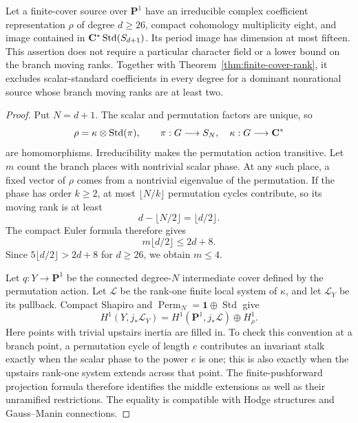 \begin{theorem}\label{thm:scalar-standard-all}
Let a finite-cover source over $\mathbf P^1$ have an irreducible
complex coefficient representation $\rho$ of degree $d\ge26$,
compact cohomology multiplicity eight, and image contained in
$\mathbf C^*\operatorname{Std}(S_{d+1})$. Its period image has dimension
at most fifteen. This assertion does not require a particular
character field or a lower bound on the branch moving ranks.
Together with Theorem~\ref{thm:finite-cover-rank}, it excludes
scalar-standard coefficients in every degree for a dominant
nonrational source whose branch moving ranks are at least two.
\end{theorem}

\begin{proof}
Put $N=d+1$. The scalar and permutation factors are unique, so
\[
 \rho=\kappa\otimes\operatorname{Std}(\pi),\qquad
 \pi:G\longrightarrow S_N,\quad\kappa:G\longrightarrow\mathbf C^*
\]
are homomorphisms. Irreducibility makes the permutation action
transitive. Let $m$ count the branch places with nontrivial scalar
phase. At any such place, a fixed vector of $\rho$ comes from a
nontrivial eigenvalue of the permutation. If the phase has order
$k\ge2$, at most $\lfloor N/k\rfloor$ permutation cycles contribute,
so its moving rank is at least
\[
 d-\lfloor N/2\rfloor=\lfloor d/2\rfloor.
\]
The compact Euler formula therefore gives
\[
 m\lfloor d/2\rfloor\le2d+8.
\]
Since $5\lfloor d/2\rfloor>2d+8$ for $d\ge26$, we obtain $m\le4$.

Let $q:Y\to\mathbf P^1$ be the connected degree-$N$ intermediate
cover defined by the permutation action. Let $\mathcal L$ be the
rank-one finite local system of $\kappa$, and let $\mathcal L_Y$
be its pullback. Compact Shapiro and
$\operatorname{Perm}_N=\mathbf1\oplus\operatorname{Std}$ give
\begin{equation}\label{eq:standard-shapiro}
 H^1(Y,j_*\mathcal L_Y)
 =H^1(\mathbf P^1,j_*\mathcal L)\oplus H^1_\rho.
\end{equation}
Here points with trivial upstairs inertia are filled in. To check
this convention at a branch point, a permutation cycle of length
$e$ contributes an invariant stalk exactly when the scalar phase
to the power $e$ is one; this is also exactly when the upstairs
rank-one system extends across that point. The finite-pushforward
projection formula therefore identifies the middle extensions as
well as their unramified restrictions. The equality is compatible
with Hodge structures and Gauss--Manin connections.


\end{proof}
